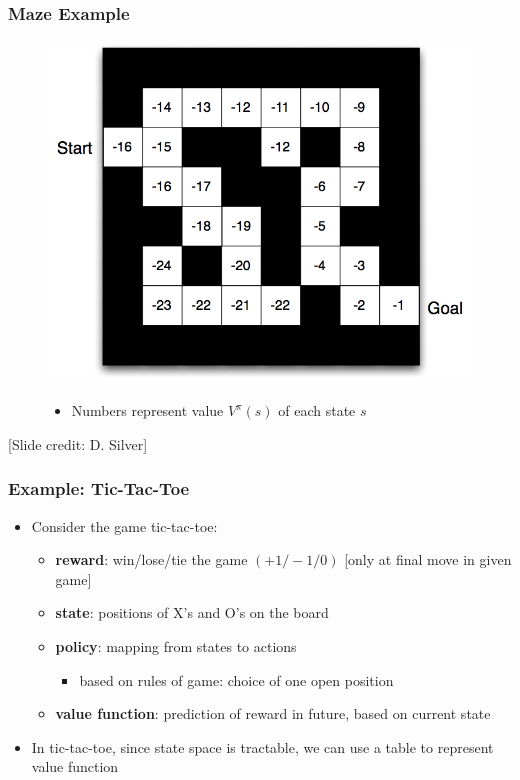 \documentclass{beamer}
\renewcommand{\high}{\textbf}
\begin{document}
\begin{frame}\frametitle{Maze Example}\small
\begin{figure}
\begin{minipage}{0.5\linewidth}
\includegraphics[width=\linewidth]{Figures/maze3}
\end{minipage}
\hspace{3mm}
\begin{minipage}{0.45\linewidth}
\begin{itemize}
\item Numbers represent value $V^{\pi}(s)$ of each state $s$
\end{itemize}
\end{minipage}
\end{figure}
\vspace{14mm}
\scriptsize [Slide credit: D. Silver]
\end{frame}

\begin{frame}\frametitle{Example: Tic-Tac-Toe}\small
\begin{itemize}
\item Consider the game tic-tac-toe:
\begin{itemize}
 \setlength\itemsep{1em}
\item \high{reward}:  win/lose/tie the game $(+1/-1/0)$ [only at final move in given game]
\item \high{state}: positions of X's and O's on the board
\item \high{policy}: mapping from states to actions 
\begin{itemize}
\item based on rules of game: choice of one open position
\end{itemize}
\item \high{value function}: prediction of reward in future, based    on current state
\end{itemize}
\item In tic-tac-toe, since state space is tractable, we can use a table to represent value function 
\end{itemize}
\end{frame}
\end{document}

